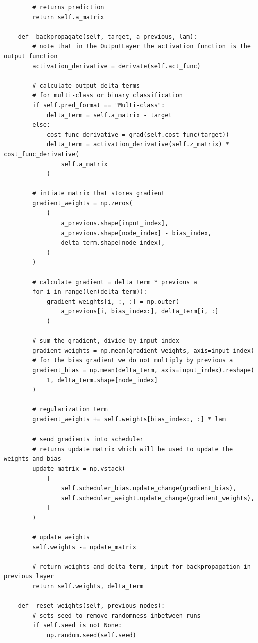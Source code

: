 \documentclass[%
oneside,                 %
final,                   %
10pt]{article}
\begin{document}
\begin{verbatim}
        # returns prediction
        return self.a_matrix

    def _backpropagate(self, target, a_previous, lam):
        # note that in the OutputLayer the activation function is the output function
        activation_derivative = derivate(self.act_func)

        # calculate output delta terms
        # for multi-class or binary classification
        if self.pred_format == "Multi-class":
            delta_term = self.a_matrix - target
        else:
            cost_func_derivative = grad(self.cost_func(target))
            delta_term = activation_derivative(self.z_matrix) * cost_func_derivative(
                self.a_matrix
            )

        # intiate matrix that stores gradient
        gradient_weights = np.zeros(
            (
                a_previous.shape[input_index],
                a_previous.shape[node_index] - bias_index,
                delta_term.shape[node_index],
            )
        )

        # calculate gradient = delta term * previous a
        for i in range(len(delta_term)):
            gradient_weights[i, :, :] = np.outer(
                a_previous[i, bias_index:], delta_term[i, :]
            )

        # sum the gradient, divide by input_index
        gradient_weights = np.mean(gradient_weights, axis=input_index)
        # for the bias gradient we do not multiply by previous a
        gradient_bias = np.mean(delta_term, axis=input_index).reshape(
            1, delta_term.shape[node_index]
        )

        # regularization term
        gradient_weights += self.weights[bias_index:, :] * lam

        # send gradients into scheduler
        # returns update matrix which will be used to update the weights and bias
        update_matrix = np.vstack(
            [
                self.scheduler_bias.update_change(gradient_bias),
                self.scheduler_weight.update_change(gradient_weights),
            ]
        )

        # update weights
        self.weights -= update_matrix

        # return weights and delta term, input for backpropagation in previous layer
        return self.weights, delta_term

    def _reset_weights(self, previous_nodes):
        # sets seed to remove randomness inbetween runs
        if self.seed is not None:
            np.random.seed(self.seed)


\end{verbatim}
\end{document}
